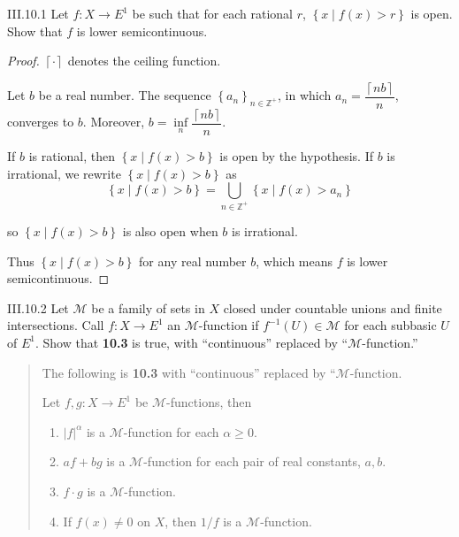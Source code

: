 \begin{problem}{III.10.1}
Let \( f: X \to E^{1} \) be such that for each rational \(r\), \( \left\{ x \mid f(x) > r \right\} \) is open. Show that \(f\) is lower semicontinuous.
\end{problem}

\begin{proof}
	\( \left\lceil \cdot \right\rceil \) denotes the ceiling function.

	Let \( b \) be a real number. The sequence \( {\left\{ a_{n} \right\}}_{n\in\mathbb{Z}^{+}} \), in which \( a_{n} = \dfrac{\left\lceil nb \right\rceil}{n} \), converges to \( b \). Moreover, \( b = \inf\limits_{n} \dfrac{\left\lceil nb \right\rceil}{n} \).

	If \( b \) is rational, then \( \left\{ x \mid f(x) > b \right\} \) is open by the hypothesis. If \( b \) is irrational, we rewrite \( \left\{ x \mid f(x) > b \right\} \) as
	\[
		\left\{ x \mid f(x) > b \right\} = \bigcup_{n \in \mathbb{Z}^{+}} \left\{ x \mid f(x) > a_{n} \right\}
	\]

	so \( \left\{ x \mid f(x) > b \right\} \) is also open when \( b \) is irrational.

	Thus \( \left\{ x \mid f(x) > b \right\} \) for any real number \( b \), which means \( f \) is lower semicontinuous.
\end{proof}

\begin{problem}{III.10.2}
Let \( \mathscr{M} \) be a family of sets in \(X\) closed under countable unions and finite intersections. Call \(f: X \to E^{1} \) an \( \mathscr{M} \)-function if \( f^{-1}(U) \in \mathscr{M} \) for each subbasic \( U \) of \( E^{1} \). Show that \textbf{10.3} is true, with ``continuous'' replaced by ``\( \mathscr{M} \)-function.\@''
\end{problem}

\begin{quote}
	The following is \textbf{10.3} with ``continuous'' replaced by ``\( \mathscr{M} \)-function.

	Let \( f, g: X \to E^{1} \) be \( \mathscr{M} \)-functions, then
	\begin{enumerate}[label={(\arabic*)}]
		\item \( {\left\vert f \right\vert}^{\alpha} \) is a \( \mathscr{M} \)-function for each \( \alpha \ge 0 \).
		\item \( af + bg \) is a \( \mathscr{M} \)-function for each pair of real constants, \( a, b \).
		\item \( f\cdot g \) is a \( \mathscr{M} \)-function.
		\item If \( f(x) \ne 0 \) on \(X\), then \( 1/f \) is a \( \mathscr{M} \)-function.
	\end{enumerate}
\end{quote}

